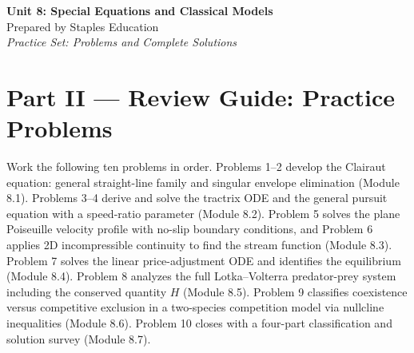 




\begin{center}
    {\LARGE \bfseries Unit 8: Special Equations and Classical Models}\\[6pt]
    {\large Prepared by Staples Education}\\[4pt]
    {\itshape Practice Set: Problems and Complete Solutions}
\end{center}

\vspace{0.4em}

{}
\section*{Part II --- Review Guide: Practice Problems}

Work the following ten problems in order. Problems 1--2 develop the Clairaut
equation: general straight-line family and singular envelope elimination
(Module 8.1). Problems 3--4 derive and solve the tractrix ODE and the general
pursuit equation with a speed-ratio parameter (Module 8.2). Problem 5 solves
the plane Poiseuille velocity profile with no-slip boundary conditions, and
Problem 6 applies 2D incompressible continuity to find the stream function
(Module 8.3). Problem 7 solves the linear price-adjustment ODE and identifies
the equilibrium (Module 8.4). Problem 8 analyzes the full Lotka--Volterra
predator-prey system including the conserved quantity $H$ (Module 8.5).
Problem 9 classifies coexistence versus competitive exclusion in a two-species
competition model via nullcline inequalities (Module 8.6). Problem 10 closes
with a four-part classification and solution survey (Module 8.7).

